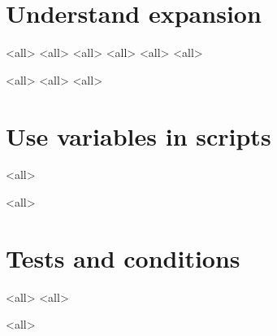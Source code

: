 
\section{Understand expansion}
\mode<all>{}
\mode<all>{}
\mode<all>{}
\mode<all>{}
\mode<all>{}
\mode<all>{}


\mode<all>{}
\mode<all>{}
\mode<all>{}


\section{Use variables in scripts}
\mode<all>{}

\mode<all>{}

\section{Tests and conditions}

\mode<all>{}
\mode<all>{}

\mode<all>{}



